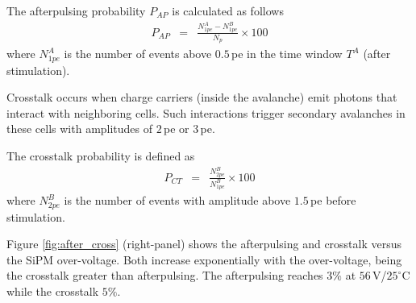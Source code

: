 \documentclass[a4paper,11pt]{article}
\begin{document}


The afterpulsing probability $P_{AP}$ is calculated as follows
\begin{eqnarray}
    P_{AP} &=& \frac{N_{1pe}^A-N_{1pe}^B}{N_p}\times 100
\label{eq:AP}
\end{eqnarray}
where $N_{1pe}^A$ is the number of events above $0.5$\,pe in the time window $T^A$ (after stimulation). 

Crosstalk occurs when charge carriers (inside the avalanche) emit photons that interact with neighboring cells. Such interactions trigger secondary avalanches in these cells with amplitudes of $2$\,pe or $3$\,pe.



The crosstalk probability \cite{Ramilli2008} is defined as
\begin{eqnarray}
    P_{CT} &=&\frac{N_{2pe}^B}{N_{1pe}^B}\times 100
\label{eq:CT}
\end{eqnarray}
where $N_{2pe}^B$ is the number of events with amplitude above $1.5$\,pe before stimulation.

Figure \ref{fig:after_cross} (right-panel) shows the afterpulsing and crosstalk versus the SiPM over-voltage. Both increase exponentially with the over-voltage, being the crosstalk greater than afterpulsing. The afterpulsing reaches $3\%$ at $56$\,V/$25^{\circ}$C while the crosstalk $5\%$.
\end{document}
